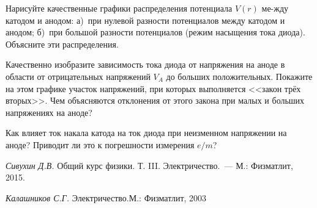 \begin{lab:questions}
	\item{Нарисуйте качественные графики распределения потенциала $V(r)$ ме-жду катодом и анодом: а)~при нулевой разности потенциалов между катодом и анодом; б)~при большой разности потенциалов (режим насыщения тока диода). Объясните эти распределения.}
	
	\item{Качественно изобразите зависимость тока диода от напряжения на аноде в области от отрицательных напряжений $V_{A}$ до больших положительных. Покажите на этом графике участок напряжений, при которых выполняется <<закон трёх вторых>>. Чем объясняются отклонения от этого закона при малых и больших напряжениях на аноде?}
	
	\item{ Как влияет ток накала катода на ток диода при неизменном напряжении на аноде? Приводит ли это к погрешности измерения $e/m$?}
\end{lab:questions}

\begin{lab:literature}
	\item{\emph{Сивухин Д.В.} Общий курс физики. Т. III. Электричество.~--- М.: Физматлит, 2015}.
	\item{\emph{Калашников С.Г.} Электричество.М.: Физматлит, 2003}
\end{lab:literature}

